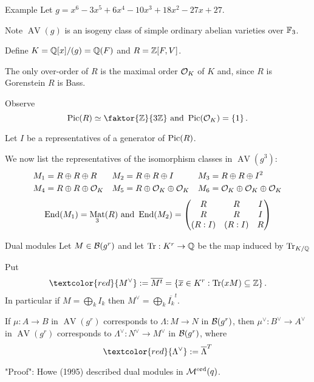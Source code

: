 \documentclass[usenames,dvipsnames]{beamer}
\DeclareMathOperator{\AV}{AV}
\DeclareMathOperator{\Mat}{Mat}
\newcommand{\Modord}[1]{\cM^{\text{ord}}({#1})}
\newcommand{\red}[1]{\textcolor{red}{#1}}
\begin{document}
\begin{frame}{ Example }
   Let $g=x^6 - 3x^5 + 6x^4 - 10x^3 + 18x^2 - 27x + 27$.
   
   \pause Note $\AV(g)$ is an isogeny class of simple ordinary abelian varieties over $\mathbb{F}_3$.
   
   \pause Define $K=\mathbb{Q}[x]/(g)=\mathbb{Q}(F)$ and $R=\mathbb{Z}[F,V]$.
   
   \pause The only over-order of $R$ is the maximal order ${\mathcal O}_K$ of $K$ and, since $R$ is Gorenstein
   $R$ is Bass.
   
   \pause Observe
   \[ \Pic(R) \simeq \faktor{\Z}{3\Z} \text{ and } \Pic(\cO_K)=\set{1}. \]
   
   \pause Let $I$ be a representatives of a generator of $\operatorname{Pic}(R)$.
   
   \pause We now list the representatives of the isomorphism classes in $\AV(g^3)$:
   \begin{align*}
	& M_1=R \oplus R \oplus R &
	& M_2=R \oplus R \oplus I &
	& M_3=R \oplus R \oplus I^2 \\
	& M_4=R \oplus R \oplus {\mathcal O}_K & 
	& M_5=R \oplus {\mathcal O}_K \oplus {\mathcal O}_K & 
	& M_6={\mathcal O}_K \oplus {\mathcal O}_K \oplus {\mathcal O}_K
   \end{align*}
   \pause 
   \[\End(M_1) = \Mat_3(R) \text{ and }
    \End(M_2)=
      \begin{pmatrix}
         R & R & I \\
         R & R & I \\
         (R:I) & (R:I) & R
      \end{pmatrix}\]
\end{frame}

\begin{frame}{ Dual modules }
Let $M \in {\mathcal B}(g^r)$ and let $\operatorname{Tr}:K^r \to \mathbb{Q}$ be the map induced by $\operatorname{Tr}_{K/\mathbb{Q}}$

\pause Put
\[ \red{M^\vee}:=\overline{M^t}=\set{ \overline{x} \in K^r : \Tr(xM)\subseteq \Z }. \]
\pause In particular if $M=\bigoplus_k I_k$ then $M^\vee=\bigoplus_k \overline{I_k}^t$.

\pause
\begin{prop}
 If $\mu:A\to B$ in $\AV(g^r)$ corresponds to $\Lambda:M\to N$ in ${\mathcal B}(g^r)$,
 \pause then $\mu^\vee:B^\vee\to A^\vee$ in $\AV(g^r)$ corresponds to $\Lambda^\vee:N^\vee\to M^\vee$ in ${\mathcal B}(g^r)$,
 where
 \[ \red{\Lambda^\vee} := \overline{\Lambda}^T \]
\end{prop}
"Proof": Howe (1995) described dual modules in $\Modord{q}$.
\end{frame}
\end{document}
